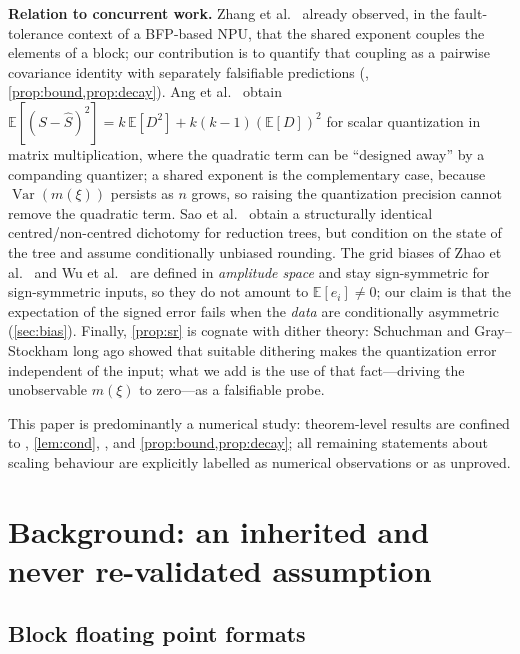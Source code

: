 \documentclass[review,hidelinks,oneeqnum,onetabnum,onefignum,onethmnum]{siamart251216}
\begin{document}
\medskip
\noindent\textbf{Relation to concurrent work.} Zhang et al.\
\cite{zhang2026bfp} already observed, in the fault-tolerance context of a
BFP-based NPU, that the shared exponent couples the elements of a block; our
contribution is to quantify that coupling as a pairwise covariance identity with
separately falsifiable predictions
(, \cref{prop:bound,prop:decay}). Ang et
al.\ \cite{ang2026quant} obtain
$\mathbb{E}[(S-\hat S)^2]=k\,\mathbb{E}[D^2]+k(k-1)(\mathbb{E}[D])^2$ for scalar
quantization in matrix multiplication, where the quadratic term can be ``designed
away'' by a companding quantizer; a shared exponent is the complementary case,
because $\operatorname{Var}(m(\xi))$ persists as $n$ grows, so raising the
quantization precision cannot remove the quadratic term. Sao et
al.\ \cite{sao2026trees} obtain a structurally identical centred/non-centred
dichotomy for reduction trees, but condition on the state of the tree and assume
conditionally unbiased rounding. The grid biases of Zhao et al.\
\cite{zhao2026shrinkage} and Wu et al.\ \cite{wu2026mxfp4} are defined in
\emph{amplitude space} and stay sign-symmetric for sign-symmetric inputs, so they
do not amount to $\mathbb{E}[e_i]\ne0$; our claim is that the expectation of the
signed error fails when the \emph{data} are conditionally asymmetric
(\cref{sec:bias}). Finally, \cref{prop:sr} is cognate with dither theory:
Schuchman \cite{schuchman1964} and Gray--Stockham \cite{gray1993dithered} long
ago showed that suitable dithering makes the quantization error independent of
the input; what we add is the use of that fact---driving the unobservable
$m(\xi)$ to zero---as a falsifiable probe.

\noindent This paper is predominantly a numerical study: theorem-level results
are confined to , \cref{lem:cond},
\crefrange{cor:bounds}{cor:srvar}, and \cref{prop:bound,prop:decay}; all
remaining statements about scaling behaviour are explicitly labelled as numerical
observations or as unproved.

\section{Background: an inherited and never re-validated assumption}
\label{sec:background}

\subsection{Block floating point formats}
\end{document}
